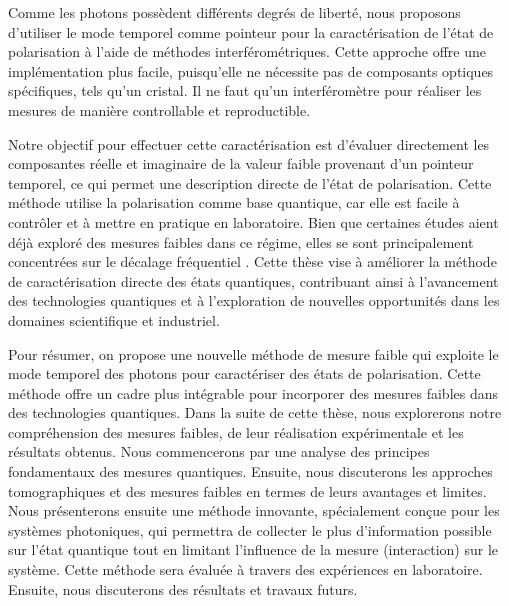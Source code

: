 \begin{onehalfspace}
    \noindent Comme les photons possèdent différents degrés de liberté, 
    nous proposons d’utiliser le mode temporel comme pointeur pour la 
    caractérisation de l’état de polarisation à l’aide de méthodes 
    interférométriques. Cette approche offre une implémentation plus 
    facile, puisqu’elle ne nécessite pas de composants optiques 
    spécifiques, tels qu’un cristal. Il ne faut qu'un interféromètre pour 
    réaliser les mesures de manière controllable et reproductible.

    \noindent Notre objectif pour effectuer cette caractérisation 
    est d’évaluer directement les composantes réelle et imaginaire de la valeur faible provenant d'un pointeur 
    temporel, ce qui permet une description directe de l’état de 
    polarisation. Cette méthode utilise la polarisation comme base 
    quantique, car elle est facile à contrôler et à mettre en pratique en 
    laboratoire. Bien que certaines études aient déjà exploré des mesures 
    faibles dans ce régime, elles se sont principalement concentrées 
    sur le décalage fréquentiel \cite{JohnCHowellFrequencyCombs,Salazar,OpticalNetworks,Steinberg_prob_div}.
    Cette thèse vise à améliorer la méthode de caractérisation directe 
    des états quantiques, contribuant ainsi à l’avancement des 
    technologies quantiques et à l’exploration de nouvelles opportunités 
    dans les domaines scientifique et industriel.

    \noindent Pour résumer, on propose une nouvelle méthode de mesure 
    faible qui exploite le mode temporel des photons pour caractériser 
    des états de polarisation. Cette méthode offre un cadre plus intégrable 
    pour incorporer des mesures faibles dans des technologies quantiques. Dans la suite 
    de cette thèse, nous explorerons notre compréhension des mesures 
    faibles, de leur réalisation expérimentale et les résultats
    obtenus. Nous commencerons par une analyse des principes 
    fondamentaux des mesures quantiques. Ensuite, nous discuterons les approches 
    tomographiques et des mesures faibles en termes de leurs avantages et 
    limites. Nous présenterons ensuite une méthode innovante, 
    spécialement conçue pour les systèmes photoniques, qui permettra de 
    collecter le plus d'information possible sur l'état quantique tout en 
    limitant l’influence de la mesure (interaction) sur le système. Cette 
    méthode sera évaluée à travers des expériences en laboratoire. Ensuite, 
    nous discuterons des résultats et travaux futurs. 
\end{onehalfspace}